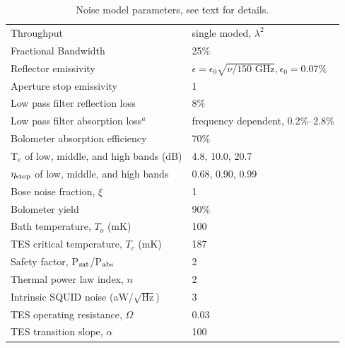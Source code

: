 \documentclass[]{spie}  %
\begin{document}
\begin{table}[ht]
\centering
\caption{Noise model parameters, see text for details. }
\label{tab:assume}
%
\begin{tabular}{|l|l|}
\hline
Throughput                       & single moded, $\lambda^2$          \\
Fractional Bandwidth             & 25\%                                             \\
Reflector emissivity             & $\epsilon = \epsilon_0\sqrt{\nu/\text{150~GHz}}, \epsilon_0 = 0.07\%$ \\
Aperture stop emissivity         & 1                                                \\
Low pass filter reflection loss  & 8\%                                                \\
Low pass filter absorption loss$^a$  & frequency dependent, 0.2\%--2.8\%             \\
Bolometer absorption efficiency  & 70\%                                             \\
T$_e$ of low, middle, and high bands (dB) & 4.8, 10.0, 20.7                                               \\
$\eta_{\rm stop}$ of low, middle, and high bands & 0.68, 0.90, 0.99   \\
Bose noise fraction, $\xi$       & 1                                                \\
Bolometer yield                 & 90\%                                             \\
Bath temperature, $T_o$ (mK)    & 100                                              \\
TES critical temperature, $T_c$ (mK)   & 187                                              \\
Safety factor, P$_{\rm sat}$/P$_{\rm abs}$      & 2                                                \\
Thermal power law index, $n$    & 2                                                \\
Intrinsic SQUID noise (aW/$\sqrt{\text{Hz}}$)   & 3                        \\
TES operating resistance, $\Omega$    &  0.03                               \\
TES transition slope, $\alpha$    & 100                                         \\

\end{tabular}
\end{table}
\end{document}
